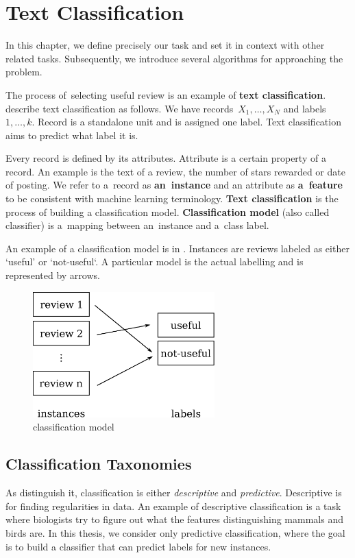 \chapter{Text Classification}\label{chap:cls}

In this chapter, we define precisely our task and set it in context with other related tasks.
Subsequently, we introduce several algorithms for approaching the problem.

The process of~selecting useful review is an example of {\bf text classification}.
\citet{AggZhai12} describe text classification as follows.
We have records~$X_1, \ldots, X_N$ and labels~$1,\ldots, k$.
Record is a standalone unit and is assigned one label.
Text classification aims to predict what label it is.

Every record is defined by its attributes.
Attribute is a certain property of a record.
An example is the text of a review, the number of stars rewarded or date of posting.
We refer to a~record as \textbf{an~instance} and an attribute as \textbf{a~feature} to be consistent with machine learning terminology.
{\bf Text classification} is the process of building a classification model.
{\bf Classification model} (also called classifier) is a~mapping between an~instance and a~class label.

An example of a classification model is in .
Instances are reviews labeled as either `useful' or `not-useful`.
A particular model is the actual labelling and is represented by arrows.

\begin{figure}[h]
	\centering
	\includegraphics[width=7cm]{figures/model.eps}
	\caption{classification model} \label{fig:cls_model}
\end{figure}


\section{Classification Taxonomies}

As \citet{TanBachKum08} distinguish it, classification is either {\it descriptive} and {\it predictive}.
Descriptive is for finding regularities in data.
An example of descriptive classification is a task where
biologists try to figure out what the features distinguishing mammals and birds are.
In this thesis, we consider only predictive classification, where the goal is to build a classifier
that can predict labels for new instances.

